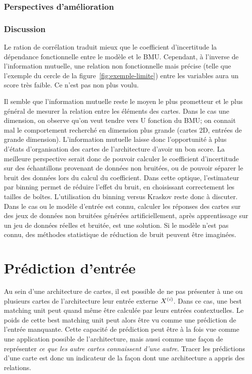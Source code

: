 \subsubsection{Perspectives d'amélioration}


\subsubsection{Discussion}

Le ration de corrélation traduit mieux que le coefficient d'incertitude la dépendance fonctionnelle entre le modèle et le BMU. Cependant, à l'inverse de l'information mutuelle, une relation non fonctionnelle mais précise (telle que l'exemple du cercle de la figure~\ref{fig:exemple-limite}) entre les variables aura un score très faible. Ce n'est pas non plus voulu. 

Il semble que l'information mutuelle reste le moyen le plus prometteur et le plus général de mesurer la relation entre les éléments des cartes. Dans le cas une dimension, on observe qu'on veut tendre vers U fonction du BMU; on connait mal le comportement recherché en dimension plus grande (cartes 2D, entrées de grande dimension). L'information mutuelle laisse donc l'opportunité à plus d'états d'organisation des cartes de l'architecture d'avoir un bon score. La meilleure perspective serait donc de pouvoir calculer le coefficient d'incertitude sur des échantillons provenant de données non bruitées, ou de pouvoir séparer le bruit des données lors du calcul du coefficient.
Dans cette optique, l'estimateur par binning permet de réduire l'effet du bruit, en choisissant correctement les tailles de boîtes. L'utilisation du binning versus Kraskov reste donc à discuter.
Dans le cas ou le modèle d'entrée est connu, calculer les réponses des cartes sur des jeux de données non bruitées générées artificiellement, après apprentissage sur un jeu de données réelles et bruitée, est une solution. Si le modèle n'est pas connu, des méthodes statistique de réduction de bruit peuvent être imaginées. 

\section{Prédiction d'entrée}

Au sein d'une architecture de cartes, il est possible de ne pas présenter à une ou plusieurs cartes de l'architecture leur entrée externe $X^{({i})}$. Dans ce cas, une best matching unit peut quand même être calculée par leurs entrées contextuelles. Le poids de cette best matching unit peut alors être vu comme une prédiction de l'entrée manquante. Cette capacité de prédiction peut être à la fois vue comme une application possible de l'architecture, mais aussi comme une façon de représenter \emph{ce que les autre cartes connaissent d'une autre}. Tracer les prédictions d'une carte est donc un indicateur de la façon dont une architecture a appris des relations. 


